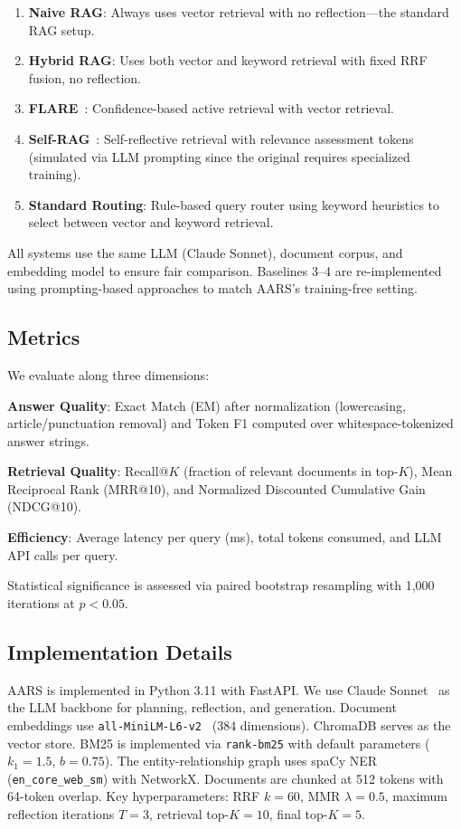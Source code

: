 \documentclass[runningheads]{llncs}
\begin{document}
\begin{enumerate}
    \item \textbf{Naive RAG}: Always uses vector retrieval with no reflection---the standard RAG setup.
    \item \textbf{Hybrid RAG}: Uses both vector and keyword retrieval with fixed RRF fusion, no reflection.
    \item \textbf{FLARE}~\cite{Jiang2023}: Confidence-based active retrieval with vector retrieval.
    \item \textbf{Self-RAG}~\cite{Asai2023}: Self-reflective retrieval with relevance assessment tokens (simulated via LLM prompting since the original requires specialized training).
    \item \textbf{Standard Routing}: Rule-based query router using keyword heuristics to select between vector and keyword retrieval.
\end{enumerate}

All systems use the same LLM (Claude Sonnet), document corpus, and embedding model to ensure fair comparison. Baselines 3--4 are re-implemented using prompting-based approaches to match AARS's training-free setting.

\subsection{Metrics}

We evaluate along three dimensions:

\textbf{Answer Quality}: Exact Match (EM) after normalization (lowercasing, article/punctuation removal) and Token F1 computed over whitespace-tokenized answer strings.

\textbf{Retrieval Quality}: Recall@$K$ (fraction of relevant documents in top-$K$), Mean Reciprocal Rank (MRR@10), and Normalized Discounted Cumulative Gain (NDCG@10).

\textbf{Efficiency}: Average latency per query (ms), total tokens consumed, and LLM API calls per query.

Statistical significance is assessed via paired bootstrap resampling with 1,000 iterations at $p < 0.05$.

\subsection{Implementation Details}

AARS is implemented in Python 3.11 with FastAPI. We use Claude Sonnet~\cite{Anthropic2024} as the LLM backbone for planning, reflection, and generation. Document embeddings use \texttt{all-MiniLM-L6-v2}~\cite{Reimers2019} (384 dimensions). ChromaDB serves as the vector store. BM25 is implemented via \texttt{rank-bm25} with default parameters ($k_1 = 1.5$, $b = 0.75$). The entity-relationship graph uses spaCy NER (\texttt{en\_core\_web\_sm}) with NetworkX. Documents are chunked at 512 tokens with 64-token overlap. Key hyperparameters: RRF $k = 60$, MMR $\lambda = 0.5$, maximum reflection iterations $T = 3$, retrieval top-$K = 10$, final top-$K = 5$.
\end{document}
